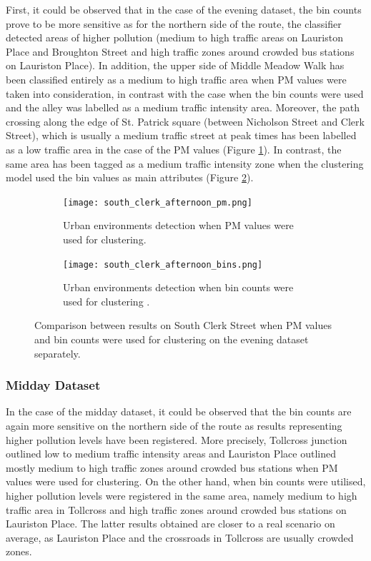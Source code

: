 \documentclass[bsc,frontabs,twoside,singlespacing, parskip,deptreport]{infthesis}     %
\begin{document}
First, it could be observed that in the case of the evening dataset, the bin counts prove to be more sensitive as for the northern side of the route, the classifier detected areas of higher pollution (medium to high traffic areas on Lauriston Place and Broughton Street and high traffic zones around crowded bus stations on Lauriston Place).  In addition, the upper side of Middle Meadow Walk has been classified entirely as a medium to high traffic area when PM values were taken into consideration, in contrast with the case when the bin counts were used and the alley was labelled as a medium traffic intensity area. Moreover, the path crossing along the edge of St. Patrick square (between Nicholson Street and Clerk Street), which is usually a medium traffic street at peak times has been labelled as a low traffic area in the case of the PM values (Figure \ref{fig:south-clerk-afternoon-pm}). In contrast, the same area has been tagged as a medium traffic intensity zone when the clustering model used the bin values as main attributes (Figure \ref{fig:south-clerk-afternoon-bins}).

\begin{figure}[h!]
  \begin{subfigure}[t]{0.5\textwidth}
    \texttt{[image: south\_clerk\_afternoon\_pm.png]}
    \caption{Urban environments detection when PM values were used for clustering.}
    \label{fig:south-clerk-afternoon-pm}
  \end{subfigure}
  \hfill
  \begin{subfigure}[t]{0.5\textwidth}
    \texttt{[image: south\_clerk\_afternoon\_bins.png]}
    \caption{Urban environments detection when bin counts were used for clustering .}
    \label{fig:south-clerk-afternoon-bins}
  \end{subfigure}
  \caption{Comparison between results on South Clerk Street when PM values and bin counts were used for clustering on the evening dataset separately.}
  \label{fig:south-clerk-comparison}
\end{figure}


\subsubsection*{Midday Dataset}

In the case of the midday dataset, it could be observed that the bin counts are again more sensitive on the northern side of the route as results representing higher pollution levels have been registered. More precisely, Tollcross junction outlined low to medium traffic intensity areas and Lauriston Place outlined mostly medium to high traffic zones around crowded bus stations when PM values were used for clustering. On the other hand, when bin counts were utilised, higher pollution levels were registered in the same area, namely medium to high traffic area in Tollcross and high traffic zones around crowded bus stations on Lauriston Place. The latter results obtained are closer to a real scenario on average, as Lauriston Place and the crossroads in Tollcross are usually crowded zones.
\end{document}
